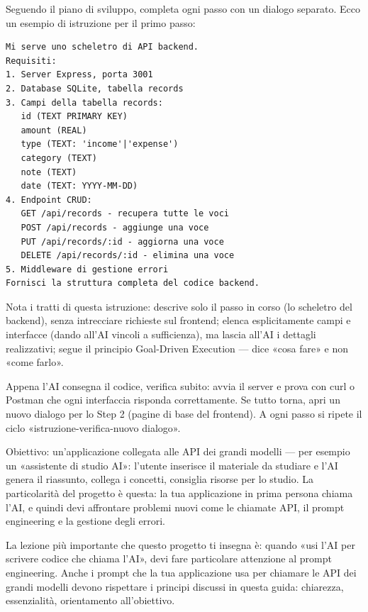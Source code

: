 
Seguendo il piano di sviluppo, completa ogni passo con un dialogo separato. Ecco un esempio di istruzione per il primo passo:

\begin{lstlisting}
Mi serve uno scheletro di API backend.
Requisiti:
1. Server Express, porta 3001
2. Database SQLite, tabella records
3. Campi della tabella records:
   id (TEXT PRIMARY KEY)
   amount (REAL)
   type (TEXT: 'income'|'expense')
   category (TEXT)
   note (TEXT)
   date (TEXT: YYYY-MM-DD)
4. Endpoint CRUD:
   GET /api/records - recupera tutte le voci
   POST /api/records - aggiunge una voce
   PUT /api/records/:id - aggiorna una voce
   DELETE /api/records/:id - elimina una voce
5. Middleware di gestione errori
Fornisci la struttura completa del codice backend.
\end{lstlisting}

Nota i tratti di questa istruzione: descrive solo il passo in corso (lo scheletro del backend), senza intrecciare richieste sul frontend; elenca esplicitamente campi e interfacce (dando all'AI vincoli a sufficienza), ma lascia all'AI i dettagli realizzativi; segue il principio Goal-Driven Execution — dice «cosa fare» e non «come farlo».

Appena l'AI consegna il codice, verifica subito: avvia il server e prova con curl o Postman che ogni interfaccia risponda correttamente. Se tutto torna, apri un nuovo dialogo per lo Step 2 (pagine di base del frontend). A ogni passo si ripete il ciclo «istruzione-verifica-nuovo dialogo».



Obiettivo: un'applicazione collegata alle API dei grandi modelli — per esempio un «assistente di studio AI»: l'utente inserisce il materiale da studiare e l'AI genera il riassunto, collega i concetti, consiglia risorse per lo studio. La particolarità del progetto è questa: la tua applicazione in prima persona chiama l'AI, e quindi devi affrontare problemi nuovi come le chiamate API, il prompt engineering e la gestione degli errori.

La lezione più importante che questo progetto ti insegna è: quando «usi l'AI per scrivere codice che chiama l'AI», devi fare particolare attenzione al prompt engineering. Anche i prompt che la tua applicazione usa per chiamare le API dei grandi modelli devono rispettare i principi discussi in questa guida: chiarezza, essenzialità, orientamento all'obiettivo.

